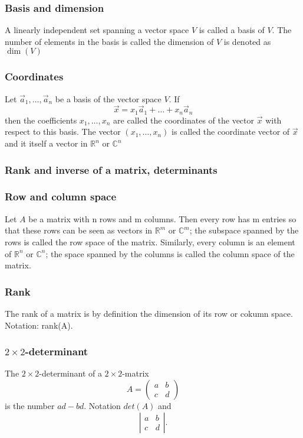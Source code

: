 \documentclass{article}
\begin{document}
			\subsubsection{Basis and dimension}
			A linearly independent set spanning a vector space $V$ is called a basis of $V$. The number of elements in the basis is called the dimension of $V$ is denoted as $\dim(V)$
			
			\subsubsection{Coordinates}
			Let $\vec{a}_1,\dots,\vec{a}_n$ be a basis of the vector space $V$. If 
			\begin{equation*}
				\vec{x} = x_1\vec{a}_1 + \dots + x_n\vec{a}_n
			\end{equation*}
			then the coefficients $x_1,\dots,x_n$ are called the coordinates of the vector $\vec{x}$ with respect to this basis. The vector $(x_1,\dots,x_n)$ is called the coordinate vector of $\vec{x}$ and it itself a vector in $\mathbb{R}^n$ or $\mathbb{C}^n$
			
		\subsubsection{Rank and inverse of a matrix, determinants}
			\subsubsection{Row and column space}
			Let $A$ be a matrix with n rows and m columns. Then every row has m entries so that these rows can be seen as vectors in $\mathbb{R}^m$ or $\mathbb{C}^m$; the subspace spanned by the rows is called the row space of the matrix. Similarly, every column is an element of $\mathbb{R}^n$ or $\mathbb{C}^n$; the space spanned by the columns is called the column space of the matrix.
			
			\subsubsection{Rank}
			The rank of a matrix is by definition the dimension of its row or cokumn space. Notation: rank(A).
			
			\subsubsection{$2 \times 2$-determinant}
			The $2\times 2$-determinant of a $2\times2$-matrix
			\begin{equation*}
				A = \begin{pmatrix}
					a & b \\
					c & d
				\end{pmatrix}
			\end{equation*}
			is the number $ad-bd$. Notation $det(A)$ and
			\[
				\left |
					\begin{matrix}
						a & b \\
						c & d
					\end{matrix}
				\right |.
			\]
			
\end{document}
